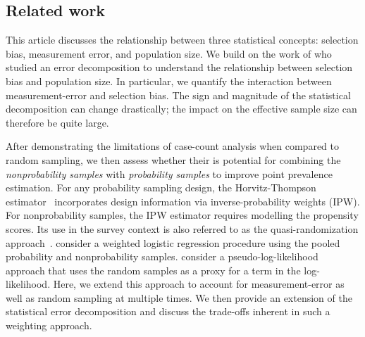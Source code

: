 \documentclass[11pt]{amsart}
\numberwithin{equation}{section}
\theoremstyle{plain}
\begin{document}

\subsection{Related work}

This article discusses the relationship between three statistical concepts: selection bias, measurement error, and population size.  We build on the work of \cite{Meng2018} who studied an error decomposition to understand the relationship between selection bias and population size.  In particular, we quantify the interaction between measurement-error and selection bias.  The sign and magnitude of the statistical decomposition can change drastically; the impact on the effective sample size can therefore be quite large.

After demonstrating the limitations of case-count analysis when compared to random sampling, we then assess whether their is potential for combining the \emph{nonprobability samples} with \emph{probability samples} to improve point prevalence estimation. For any probability sampling design, the Horvitz-Thompson estimator~\citep{HT1952} incorporates design information via inverse-probability weights (IPW).  For nonprobability samples, the IPW estimator requires modelling the propensity scores.  Its use in the survey context is also referred to as the quasi-randomization approach~\citep{Elliott2017}. \cite{Valliant2011} consider a weighted logistic regression procedure using the pooled probability and nonprobability samples.  \cite{Chen2019} consider a pseudo-log-likelihood approach that uses the random samples as a proxy for a term in the log-likelihood.  Here, we extend this approach to account for measurement-error as well as random sampling at multiple times. We then provide an extension of the statistical error decomposition and discuss the trade-offs inherent in such a weighting approach.
\end{document}
